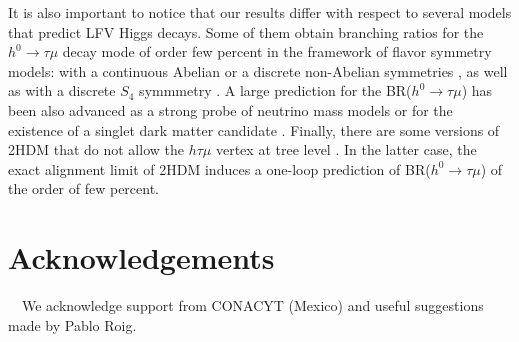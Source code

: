\documentclass[a4paper]{jpconf}
\begin{document}
It is also important to notice that our results differ with respect to several models that predict LFV Higgs decays. Some of them obtain branching ratios for the $h^0\to \tau\mu$ decay mode of order few percent in the framework of flavor symmetry models: with a continuous Abelian or a discrete non-Abelian symmetries \cite{HEECK2015281}, as well as with a discrete $S_{4}$ symmmetry \cite{PhysRevD.91.116011}. A large prediction for the BR($h^0\to\tau\mu$) has been also advanced as a strong probe of neutrino mass models \cite{AOKI2016352} or for the existence of a singlet dark matter candidate \cite{BAEK201691}. Finally, there are some versions of 2HDM that do not allow the $h\tau\mu$ vertex at tree level \cite{WANG2017123}. In the latter case, the exact alignment limit of 2HDM induces a one-loop prediction of BR($h^0\to\tau\mu$) of the order of few percent.

\section*{Acknowledgements}
\ \
We acknowledge support from CONACYT (Mexico) and useful suggestions made by Pablo Roig.



\end{document}
